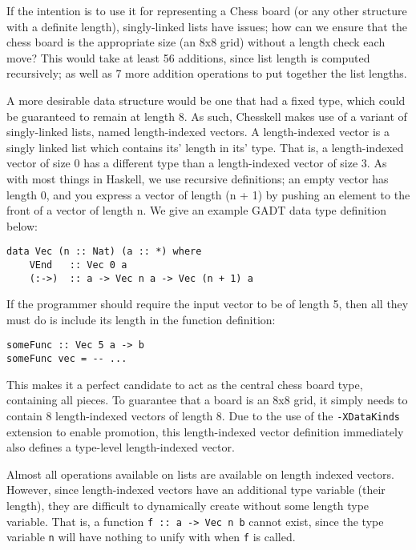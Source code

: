 \documentclass[12pt, a4paper, bibliography=totocnumbered]{scrreprt}
\newcommand{\inline}[1]{\lstinline[basicstyle=\ttfamily\footnotesize]{#1}}
\begin{document}
If the intention is to use it for representing a Chess board (or any other structure with a definite length), singly-linked lists have issues; how can we ensure that the chess board is the appropriate size (an 8x8 grid) without a length check each move? This would take at least 56 additions, since list length is computed recursively; as well as 7 more addition operations to put together the list lengths.

A more desirable data structure would be one that had a fixed type, which could be guaranteed to remain at length 8. As such, Chesskell makes use of a variant of singly-linked lists, named length-indexed vectors. A length-indexed vector is a singly linked list which contains its' length in its' type. That is, a length-indexed vector of size 0 has a different type than a length-indexed vector of size 3. As with most things in Haskell, we use recursive definitions; an empty vector has length 0, and you express a vector of length (n + 1) by pushing an element to the front of a vector of length n. We give an example GADT data type definition below:

\begin{lstlisting}
data Vec (n :: Nat) (a :: *) where
    VEnd   :: Vec 0 a
    (:->)  :: a -> Vec n a -> Vec (n + 1) a
\end{lstlisting}

If the programmer should require the input vector to be of length 5, then all they must do is include its length in the function definition:

\begin{lstlisting}
someFunc :: Vec 5 a -> b
someFunc vec = -- ...
\end{lstlisting}

This makes it a perfect candidate to act as the central chess board type, containing all pieces. To guarantee that a board is an 8x8 grid, it simply needs to contain 8 length-indexed vectors of length 8. Due to the use of the \inline{-XDataKinds} extension to enable promotion, this length-indexed vector definition immediately also defines a type-level length-indexed vector.

Almost all operations available on lists are available on length indexed vectors. However, since length-indexed vectors have an additional type variable (their length), they are difficult to dynamically create without some length type variable. That is, a function \inline{f :: a -> Vec n b} cannot exist, since the type variable \inline{n} will have nothing to unify with when \inline{f} is called.
\end{document}
